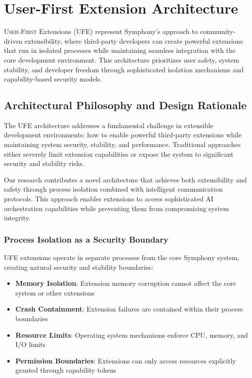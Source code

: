 
\section{User-First Extension Architecture}
\label{sec:ufe-concept}

\lettrine{U}{ser-First} Extensions (UFE) represent Symphony's approach to community-driven extensibility, where third-party developers can create powerful extensions that run in isolated processes while maintaining seamless integration with the core development environment. This architecture prioritizes user safety, system stability, and developer freedom through sophisticated isolation mechanisms and capability-based security models.

\subsection{Architectural Philosophy and Design Rationale}

The UFE architecture addresses a fundamental challenge in extensible development environments: how to enable powerful third-party extensions while maintaining system security, stability, and performance. Traditional approaches either severely limit extension capabilities or expose the system to significant security and stability risks.

Our research contributes a novel architecture that achieves both extensibility and safety through process isolation combined with intelligent communication protocols. This approach enables extensions to access sophisticated AI orchestration capabilities while preventing them from compromising system integrity.

\subsubsection{Process Isolation as a Security Boundary}

UFE extensions operate in separate processes from the core Symphony system, creating natural security and stability boundaries:

\begin{itemize}
    \item \textbf{Memory Isolation}: Extension memory corruption cannot affect the core system or other extensions
    \item \textbf{Crash Containment}: Extension failures are contained within their process boundaries
    \item \textbf{Resource Limits}: Operating system mechanisms enforce CPU, memory, and I/O limits
    \item \textbf{Permission Boundaries}: Extensions can only access resources explicitly granted through capability tokens
\end{itemize}

